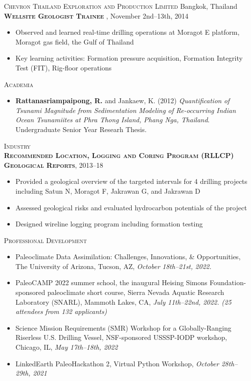 \documentclass[10pt, letter]{article}
\newcommand{\myname}[1]{\textbf{Rattanasriampaipong, R.}}
\newcommand{\margintext}[1]{\marginnote{\normalsize\textbf #1 |}}
\begin{document}
\bigskip
\textsc{Chevron Thailand Exploration and Production Limited} \hfill Bangkok, Thailand \\
\textsc{\textbf{Wellsite Geologist Trainee }}, November 2nd–13th, 2014
\begin{itemize}[leftmargin=*]
    \item Observed and learned real-time drilling operations at Moragot E platform, Moragot gas field, the Gulf of Thailand
    \item Key learning activities: Formation pressure acquisition, Formation Integrity Test (FIT), Rig-floor operations 
\end{itemize}

\bigskip
\margintext{Technical Reports}
\textsc{Academia}
\begin{itemize}[leftmargin=*]
    \item[] {\myname{rattanasriampaipong}} and Jankaew, K. (2012) \textit{Quantification of Tsunami Magnitude from Sedimentation Modeling of Re-occurring Indian Ocean Tsunamiites at Phra Thong Island, Phang Nga, Thailand}. Undergraduate Senior Year Researh Thesis.
\end{itemize}   

\bigskip
\textsc{Industry} \\
\textsc{\textbf{Recommended Location, Logging and Coring Program (RLLCP) Geological Reports}}, 2013–18
\begin{itemize}[leftmargin=*]
    \item Provided a geological overview of the targeted intervals for 4 drilling projects including Satun N, Moragot F, Jakrawan G, and Jakrawan D
    \item Assessed geological risks and evaluated hydrocarbon potentials of the project
    \item Designed wireline logging program including formation testing
\end{itemize} 

\bigskip
\margintext{Workshops}
\textsc{Professional Development}

\begin{itemize}[leftmargin=*]
    \item[] Paleoclimate Data Assimilation: Challenges, Innovations, \& Opportunities, The University of Arizona, Tucson, AZ, \textit{October 18th–21st, 2022.}
    \item[] PaleoCAMP 2022 summer school, the inaugural Heising Simons Foundation-sponsored paleoclimate short course, Sierra Nevada Aquatic Research Laboratory (SNARL), Mammoth Lakes, CA, \textit{July 11th–22nd, 2022. (25 attendees from 132 applicants)}
    \item[] Science Mission Requirements (SMR) Workshop for a Globally-Ranging Riserless U.S. Drilling Vessel, NSF-sponsored USSSP-IODP workshop, Chicago, IL, \textit{May 17th–18th, 2022}
    \item[] LinkedEarth PaleoHackathon 2, Virtual Python Workshop, \textit{October 28th–29th, 2021 }
\end{itemize} 
\end{document}
